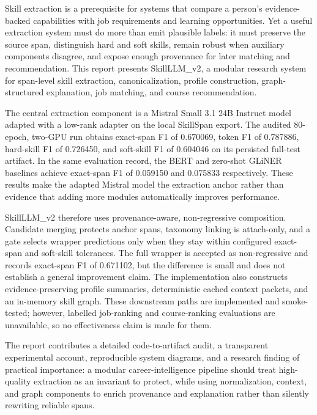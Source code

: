 Skill extraction is a prerequisite for systems that compare a person's evidence-backed capabilities with job requirements and learning opportunities. Yet a useful extraction system must do more than emit plausible labels: it must preserve the source span, distinguish hard and soft skills, remain robust when auxiliary components disagree, and expose enough provenance for later matching and recommendation. This report presents SkillLLM\_v2, a modular research system for span-level skill extraction, canonicalization, profile construction, graph-structured explanation, job matching, and course recommendation.

The central extraction component is a Mistral Small 3.1 24B Instruct model adapted with a low-rank adapter on the local SkillSpan export. The audited 80-epoch, two-GPU run obtains exact-span F1 of 0.670069, token F1 of 0.787886, hard-skill F1 of 0.726450, and soft-skill F1 of 0.604046 on its persisted full-test artifact. In the same evaluation record, the BERT and zero-shot GLiNER baselines achieve exact-span F1 of 0.059150 and 0.075833 respectively. These results make the adapted Mistral model the extraction anchor rather than evidence that adding more modules automatically improves performance.

SkillLLM\_v2 therefore uses provenance-aware, non-regressive composition. Candidate merging protects anchor spans, taxonomy linking is attach-only, and a gate selects wrapper predictions only when they stay within configured exact-span and soft-skill tolerances. The full wrapper is accepted as non-regressive and records exact-span F1 of 0.671102, but the difference is small and does not establish a general improvement claim. The implementation also constructs evidence-preserving profile summaries, deterministic cached context packets, and an in-memory skill graph. These downstream paths are implemented and smoke-tested; however, labelled job-ranking and course-ranking evaluations are unavailable, so no effectiveness claim is made for them.

The report contributes a detailed code-to-artifact audit, a transparent experimental account, reproducible system diagrams, and a research finding of practical importance: a modular career-intelligence pipeline should treat high-quality extraction as an invariant to protect, while using normalization, context, and graph components to enrich provenance and explanation rather than silently rewriting reliable spans.
